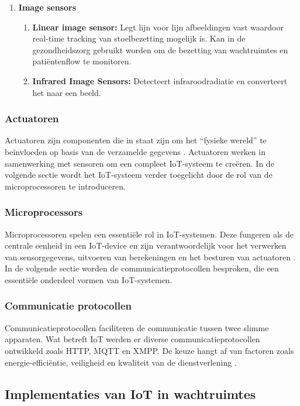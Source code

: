 {\begin{enumerate}
    \item \textbf{Image sensors}
    \begin{enumerate}
        \item \textbf{Linear image sensor:} Legt lijn voor lijn afbeeldingen vast waardoor real-time tracking van stoelbezetting mogelijk is. Kan in de gezondheidszorg gebruikt worden om de bezetting van wachtruimtes en patiëntenflow te monitoren.
        \item \textbf{Infrared Image Sensors:} Detecteert infraroodradiatie en converteert het naar een beeld.
    \end{enumerate}
\end{enumerate}


\subsubsection{Actuatoren}
Actuatoren zijn componenten die in staat zijn om het “fysieke wereld” te beïnvloeden op basis van de verzamelde gegevens \autocite{Moyer2019}. Actuatoren werken in samenwerking met sensoren om een compleet IoT-systeem te creëren. In de volgende sectie wordt het IoT-systeem verder toegelicht door de rol van de microprocessoren te introduceren.

\subsubsection{Microprocessors}
Microprocessoren spelen een essentiële rol in IoT-systemen. Deze fungeren als de centrale eenheid in een IoT-device en zijn verantwoordelijk voor het verwerken van sensorgegevens, uitvoeren van berekeningen en het besturen van actuatoren \autocite{Abraham2023, James2021}. In de volgende sectie worden de communicatieprotocollen besproken, die een essentiële onderdeel vormen van IoT-systemen.

\subsubsection{Communicatie protocollen}
Communicatieprotocollen faciliteren de communicatie tussen twee slimme apparaten. Wat betreft IoT werden er diverse communicatieprotocollen ontwikkeld zoals HTTP, MQTT en XMPP. De keuze hangt af van factoren zoals energie-efficiëntie, veiligheid en kwaliteit van de dienstverlening \autocite{Anitha2022, Jeddou2020}. 

\subsection{Implementaties van IoT in wachtruimtes} \label{wachtruimte}

}
